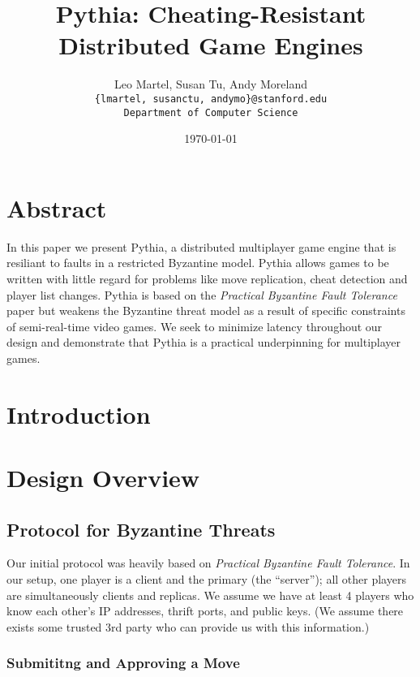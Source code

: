 \documentclass[12pt]{article}
\title{Pythia: Cheating-Resistant Distributed Game Engines}
\author{Leo Martel, Susan Tu, Andy Moreland \\ \tt{\{lmartel, susanctu, andymo\}@stanford.edu} \\ Department of Computer Science}
\date{\today}
\begin{document}
\maketitle

\section{Abstract}

In this paper we present Pythia, a distributed multiplayer game engine that is resiliant to faults in a restricted Byzantine model. Pythia allows games to be written with little regard for problems like move replication, cheat detection and player list changes. Pythia is based on the \emph{Practical Byzantine Fault Tolerance} paper but weakens the Byzantine threat model as a result of specific constraints of semi-real-time video games. We seek to minimize latency throughout our design and demonstrate that Pythia is a practical underpinning for multiplayer games.

\section{Introduction}

\section{Design Overview}

\subsection{Protocol for Byzantine Threats}

Our initial protocol was heavily based on \emph{Practical Byzantine Fault Tolerance}. In our setup, one player is a client and the primary (the “server”); all other players are simultaneously clients and replicas. We assume we have at least 4 players who know each other’s IP addresses, thrift ports, and public keys. (We assume there exists some trusted 3rd party who can provide us with this information.)

\subsubsection{Submititng and Approving a Move}
\end{document}
